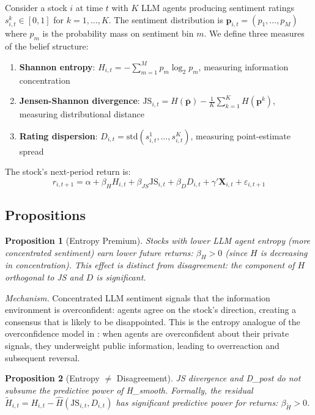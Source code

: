 \documentclass[12pt,a4paper]{article}
\newtheorem{proposition}{Proposition}
\begin{document}
Consider a stock $i$ at time $t$ with $K$ LLM agents producing sentiment ratings $s_{i,t}^k \in [0,1]$ for $k = 1, \ldots, K$. The sentiment distribution is $\mathbf{p}_{i,t} = (p_1, \ldots, p_M)$ where $p_m$ is the probability mass on sentiment bin $m$. We define three measures of the belief structure:

\begin{enumerate}
\item \textbf{Shannon entropy}: $H_{i,t} = -\sum_{m=1}^{M} p_m \log_2 p_m$, measuring information concentration
\item \textbf{Jensen-Shannon divergence}: $\text{JS}_{i,t} = H(\bar{\mathbf{p}}) - \frac{1}{K}\sum_{k=1}^{K} H(\mathbf{p}^k)$, measuring distributional distance
\item \textbf{Rating dispersion}: $D_{i,t} = \text{std}(s_{i,t}^1, \ldots, s_{i,t}^K)$, measuring point-estimate spread
\end{enumerate}

The stock's next-period return is:
\begin{equation}\label{eq:return}
r_{i,t+1} = \alpha + \beta_H H_{i,t} + \beta_{JS} \text{JS}_{i,t} + \beta_D D_{i,t} + \gamma' \mathbf{X}_{i,t} + \varepsilon_{i,t+1}
\end{equation}

\subsection{Propositions}

\begin{proposition}[Entropy Premium]\label{prop:entropy}
Stocks with lower LLM agent entropy (more concentrated sentiment) earn lower future returns: $\beta_H > 0$ (since $H$ is decreasing in concentration). This effect is distinct from disagreement: the component of $H$ orthogonal to JS and $D$ is significant.
\end{proposition}

\noindent\textit{Mechanism.} Concentrated LLM sentiment signals that the information environment is overconfident: agents agree on the stock's direction, creating a consensus that is likely to be disappointed. This is the entropy analogue of the overconfidence model in \citet{Daniel1998}: when agents are overconfident about their private signals, they underweight public information, leading to overreaction and subsequent reversal.

\begin{proposition}[Entropy $\neq$ Disagreement]\label{prop:distinct}
JS divergence and D\_post do not subsume the predictive power of H\_smooth. Formally, the residual $\tilde{H}_{i,t} = H_{i,t} - \hat{H}(\text{JS}_{i,t}, D_{i,t})$ has significant predictive power for returns: $\beta_{\tilde{H}} > 0$.
\end{proposition}
\end{document}
